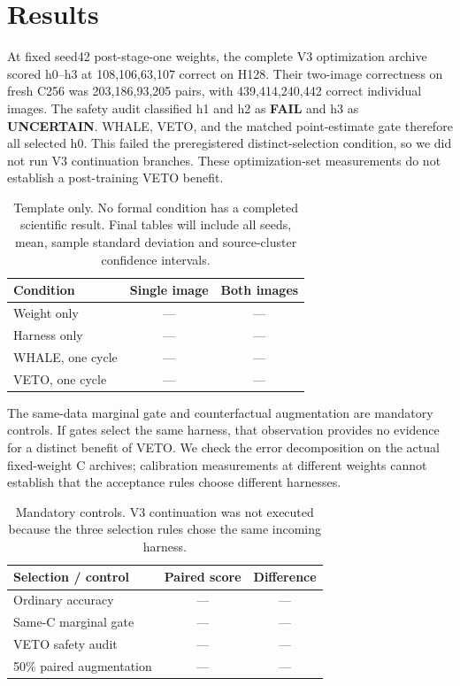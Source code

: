 \documentclass[10pt,twocolumn,letterpaper]{article}
\begin{document}
\section{Results}
At fixed seed42 post-stage-one weights, the complete V3 optimization archive
scored h0--h3 at 108,106,63,107 correct on H128. Their two-image correctness
on fresh C256 was 203,186,93,205 pairs, with 439,414,240,442 correct individual
images. The safety audit classified h1 and h2 as \textbf{FAIL} and h3 as
\textbf{UNCERTAIN}. WHALE, VETO, and the matched point-estimate gate therefore
all selected h0. This failed the preregistered distinct-selection condition, so
we did not run V3 continuation branches. These optimization-set measurements
do not establish a post-training VETO benefit.
\begin{table}[t]\centering\small
\begin{tabular}{lcc}\toprule
Condition & Single image & Both images\\\midrule
Weight only & --- & ---\\
Harness only & --- & ---\\
WHALE, one cycle & --- & ---\\
VETO, one cycle & --- & ---\\\bottomrule
\end{tabular}
\caption{Template only. No formal condition has a completed scientific result.
Final tables will include all seeds, mean, sample standard deviation and
source-cluster confidence intervals.}\label{tab:main}
\end{table}

The same-data marginal gate and counterfactual augmentation are mandatory
controls. If gates select the same harness, that observation provides no
evidence for a distinct benefit of VETO. We check the error decomposition on
the actual fixed-weight C archives; calibration measurements at different
weights cannot establish that the acceptance rules choose different harnesses.

\begin{table}[t]\centering\small
\begin{tabular}{lcc}\toprule
Selection / control & Paired score & Difference\\\midrule
Ordinary accuracy & --- & ---\\
Same-C marginal gate & --- & ---\\
VETO safety audit & --- & ---\\
50\% paired augmentation & --- & ---\\\bottomrule
\end{tabular}
\caption{Mandatory controls. V3 continuation was not executed because the three
selection rules chose the same incoming harness.}\label{tab:ablation}
\end{table}
\end{document}
